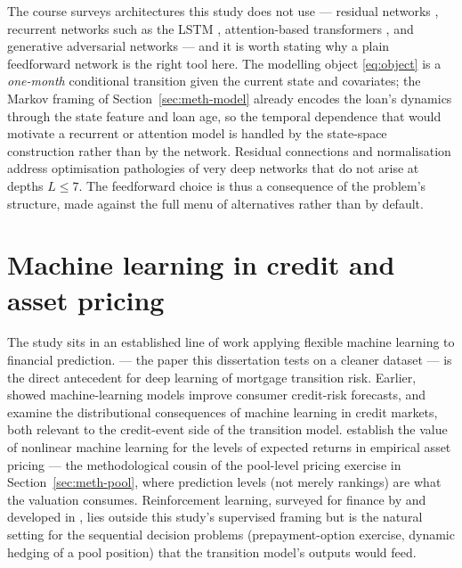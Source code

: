The course surveys architectures this study does not use ---
residual networks \citep{he2016}, recurrent networks such as the LSTM
\citep{hochreiter1997}, attention-based transformers
\citep{vaswani2017}, and generative adversarial networks
\citep{goodfellow2014gan} --- and it is worth stating why a plain
feedforward network is the right tool here. The modelling object
\eqref{eq:object} is a \emph{one-month} conditional transition given
the current state and covariates; the Markov framing of
Section~\ref{sec:meth-model} already encodes the loan's dynamics
through the state feature and loan age, so the temporal dependence that
would motivate a recurrent or attention model is handled by the
state-space construction rather than by the network. Residual
connections and normalisation address optimisation pathologies of very
deep networks that do not arise at depths $L\le 7$. The feedforward
choice is thus a consequence of the problem's structure, made against
the full menu of alternatives rather than by default.

\section{Machine learning in credit and asset pricing}
\label{sec:dlf-lineage}

The study sits in an established line of work applying flexible
machine learning to financial prediction. \citet{sirignano2021} ---
the paper this dissertation tests on a cleaner dataset --- is the
direct antecedent for deep learning of mortgage transition risk.
Earlier, \citet{khandani2010} showed machine-learning models improve
consumer credit-risk forecasts, and \citet{fuster2022} examine the
distributional consequences of machine learning in credit markets,
both relevant to the credit-event side of the transition model.
\citet{gukellyxiu2020} establish the value of nonlinear machine
learning for the levels of expected returns in empirical asset
pricing --- the methodological cousin of the pool-level pricing
exercise in Section~\ref{sec:meth-pool}, where prediction levels (not
merely rankings) are what the valuation consumes. Reinforcement
learning, surveyed for finance by \citet{bai2025} and developed in
\citet{suttonbarto2018}, lies outside this study's supervised framing
but is the natural setting for the sequential decision problems
(prepayment-option exercise, dynamic hedging of a pool position) that
the transition model's outputs would feed.

